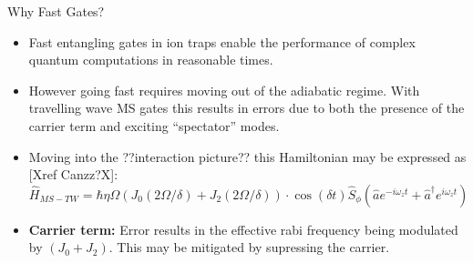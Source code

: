\documentclass[final]{beamer}
\begin{document}
\begin{frame}{}
\begin{center}
\begin{columns}[t]
\begin{column}{0.49\textwidth}
\begin{alertblock}{Why Fast Gates?}
\begin{itemize}
      \item Fast entangling gates in ion traps enable the
            performance of complex quantum computations in reasonable times.\vspace{0.8em}

      \item However going fast requires moving out of the adiabatic
            regime. With travelling wave MS gates this results in errors
            due to both the presence of the carrier term and exciting
            ``spectator'' modes.\vspace{0.4em}

      \item Moving into the ??interaction picture?? this Hamiltonian
            may be expressed as [Xref Canzz?X]:
      \Large$$ \hat{H}_{MS-TW} = \hbar\eta\Omega(J_0(2\Omega/\delta) + J_2(2\Omega/\delta))\cdot \cos{(\delta t)}\hat{S}_{\phi}(\hat{a}e^{-i\omega_zt} + \hat{a}^\dagger e^{i\omega_zt})$$\normalsize
      \end{itemize}
      \begin{minipage}{0.6\textwidth}
      \begin{itemize}
      \item \textbf{Carrier term:} Error results in the effective rabi
        frequency being modulated by $(J_0 + J_2)$. This may be
        mitigated by supressing the carrier.\vspace{0.8em}


\end{itemize}
\end{minipage}
\end{alertblock}
\end{column}
\end{columns}
\end{center}
\end{frame}
\end{document}
